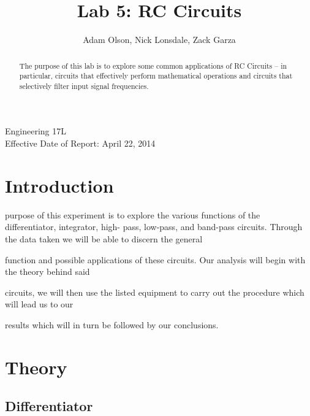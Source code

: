 \documentclass[twocolumn,english]{IEEEtran}
\theoremstyle{plain}
\theoremstyle{plain}
\begin{document}
\onecolumn
\title{Lab 5: RC Circuits}


\author{Adam Olson, Nick Lonsdale, Zack Garza}


\IEEEspecialpapernotice
{Engineering 17L \\
Effective Date of Report: April 22, 2014}


\maketitle
\thispagestyle{plain}
\pagestyle{plain}

\begin{abstract}
The purpose of this lab is to explore some common applications of RC Circuits -- in particular, circuits that effectively perform mathematical operations and circuits that selectively filter input signal frequencies.
\end{abstract}

\tableofcontents

\twocolumn

\listoffigures

\hrulefill


\section{Introduction}
purpose of this experiment is to explore the various functions of the differentiator, integrator, high-
pass, low-pass, and band-pass circuits. Through the data taken we will be able to discern the general

function and possible applications of these circuits. Our analysis will begin with the theory behind said

circuits, we will then use the listed equipment to carry out the procedure which will lead us to our

results which will in turn be followed by our conclusions.

\section{Theory}
	\subsection{Differentiator}
\end{document}
